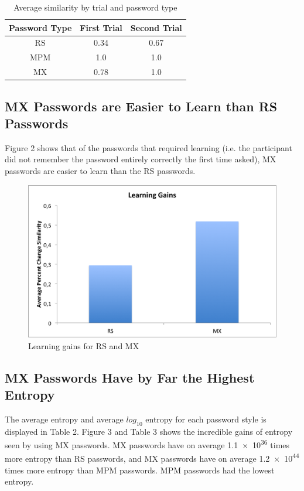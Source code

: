 \documentclass{article}
\begin{document}
\begin{table}
\centering
\begin{tabular}{|c|c|c|}
\hline
Password Type & First Trial & Second Trial \\
\hline
RS & 0.34 & 0.67 \\
\hline
MPM & 1.0 & 1.0 \\
\hline
MX & 0.78 & 1.0 \\
\hline
\end{tabular}
\caption{Average similarity by trial and password type}
\end{table}

\subsection*{MX Passwords are Easier to Learn than RS Passwords}
Figure 2 shows that of the passwords that required learning (i.e. the participant did not remember the password entirely correctly the first time asked), MX passwords are easier to learn than the RS passwords. 
\begin{figure}[h]
\centering
\includegraphics[scale=0.7]{learningGains.png}
\caption{Learning gains for RS and MX}
\end{figure}

\subsection*{MX Passwords Have by Far the Highest Entropy}
The average  entropy and average $log_{10}$ entropy for each password style is displayed in Table 2. Figure 3 and Table 3 shows the incredible gains of entropy seen by using MX passwords. MX passwords have on average \num{1.1e36} times more entropy than RS passwords, and MX passwords have on average \num{1.2e44} times more entropy than MPM passwords. MPM passwords had the lowest entropy. 
\end{document}
